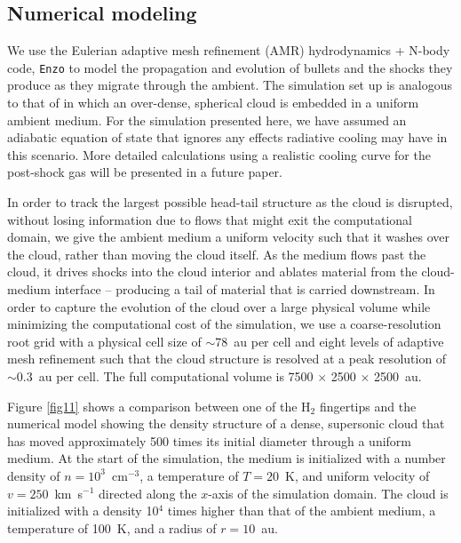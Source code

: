 \documentclass{aa}
\begin{document}
\subsection{Numerical modeling}

We use the Eulerian adaptive mesh refinement (AMR) hydrodynamics + N-body 
code,  \texttt{Enzo} \citep{Bryan2014} to model the propagation and evolution 
of bullets and the shocks they produce as they migrate through the ambient.  
The simulation set up is analogous to that of  \citet{Silvia2010, Silvia2012}  in 
which an over-dense, spherical cloud is embedded in a uniform ambient medium.  
For the simulation presented here, we have assumed an adiabatic equation of 
state that ignores any effects radiative cooling may have in this scenario.  
More detailed calculations using a realistic cooling curve for the post-shock 
gas will be presented in a future paper.

In order to track the largest possible head-tail structure as the cloud is disrupted, 
without losing information due to flows that might exit the computational domain, 
we give the ambient medium a uniform velocity such that it washes over the cloud, 
rather than moving the cloud itself.  As the medium flows past the cloud, it drives 
shocks into the cloud interior and ablates material from the cloud-medium 
interface -- producing a tail of material that is carried downstream.  In order to 
capture the evolution of the cloud over a large physical volume while minimizing 
the computational cost of the simulation, we use a coarse-resolution root grid with 
a physical cell size of $\sim$78~au per cell and eight levels of adaptive mesh 
refinement such that the cloud structure is resolved at a peak resolution of 
$\sim$0.3~au per cell.  The full computational volume is 7500 
$\times$ 2500 $\times$ 2500~au.

Figure \ref{fig11} shows a comparison between one of the H$_2$ fingertips and the 
numerical model showing the density structure of a dense, supersonic cloud 
that  has moved approximately 500 
times its initial diameter through a uniform medium.   At the start of the simulation, 
the medium is initialized with a number density of $n = 10^3$~cm$^{-3}$, a 
temperature of $T = 20$~K, and uniform velocity of $v = 250$~km~s$^{-1}$ 
directed along the $x$-axis of the simulation domain.  The cloud is initialized 
with a density 10$^4$ times higher than that of the ambient medium, a
temperature of 100~K, and a radius of $r = 10$~au.
\end{document}

